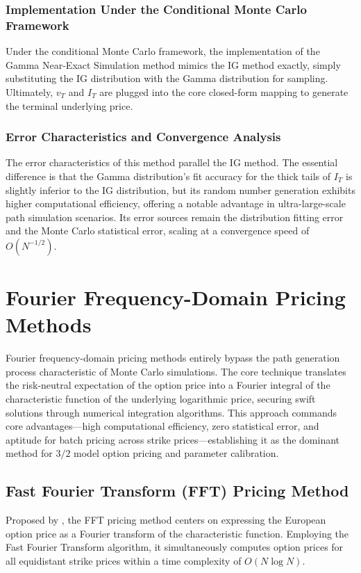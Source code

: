 \subsubsection{Implementation Under the Conditional Monte Carlo Framework}
Under the conditional Monte Carlo framework, the implementation of the Gamma Near-Exact Simulation method mimics the IG method exactly, simply substituting the IG distribution with the Gamma distribution for sampling. Ultimately, $v_T$ and $I_T$ are plugged into the core closed-form mapping to generate the terminal underlying price.

\subsubsection{Error Characteristics and Convergence Analysis}
The error characteristics of this method parallel the IG method. The essential difference is that the Gamma distribution's fit accuracy for the thick tails of $I_T$ is slightly inferior to the IG distribution, but its random number generation exhibits higher computational efficiency, offering a notable advantage in ultra-large-scale path simulation scenarios. Its error sources remain the distribution fitting error and the Monte Carlo statistical error, scaling at a convergence speed of $O(N^{-1/2})$.

\section{Fourier Frequency-Domain Pricing Methods}
Fourier frequency-domain pricing methods entirely bypass the path generation process characteristic of Monte Carlo simulations. The core technique translates the risk-neutral expectation of the option price into a Fourier integral of the characteristic function of the underlying logarithmic price, securing swift solutions through numerical integration algorithms. This approach commands core advantages—high computational efficiency, zero statistical error, and aptitude for batch pricing across strike prices—establishing it as the dominant method for $3/2$ model option pricing and parameter calibration.

\subsection{Fast Fourier Transform (FFT) Pricing Method}
Proposed by \citet{carrOptionValuationUsing1999}, the FFT pricing method centers on expressing the European option price as a Fourier transform of the characteristic function. Employing the Fast Fourier Transform algorithm, it simultaneously computes option prices for all equidistant strike prices within a time complexity of $O(N \log N)$.

